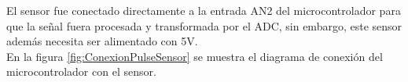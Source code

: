 %
%
%	
%
%	
%	
%	
El sensor fue conectado directamente a la entrada AN2 del microcontrolador para que la señal fuera procesada y transformada por el ADC, sin embargo, este sensor además necesita ser alimentado con 5V.\\

En la figura \ref{fig:ConexionPulseSensor} se muestra el diagrama de conexión del microcontrolador con el sensor.\\
	
